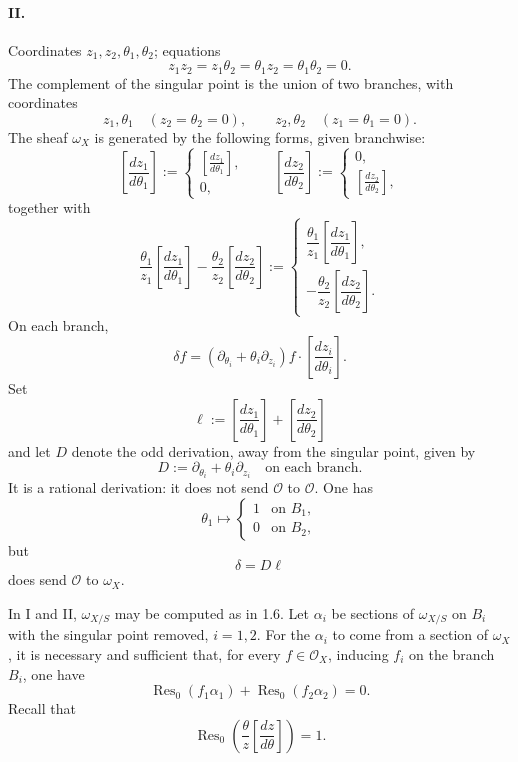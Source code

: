 \documentclass[11pt]{article}
\newcommand{\cO}{\mathcal O}
\newcommand{\Res}{\operatorname{Res}}
\begin{document}
\paragraph{II.}
Coordinates $z_1,z_2,\theta_1,\theta_2$; equations
\[
  z_1z_2=z_1\theta_2=\theta_1z_2=\theta_1\theta_2=0.
\]
The complement of the singular point is the union of two branches, with coordinates
\[
  z_1,\theta_1\quad (z_2=\theta_2=0),
  \qquad
  z_2,\theta_2\quad (z_1=\theta_1=0).
\]
The sheaf $\omega_X$ is generated by the following forms, given branchwise:
\[
\left[\frac{dz_1}{d\theta_1}\right]
 :=
 \begin{cases}
 \left[\frac{dz_1}{d\theta_1}\right],\\ 0,
 \end{cases}
\qquad
\left[\frac{dz_2}{d\theta_2}\right]
 :=
 \begin{cases}
 0,\\ \left[\frac{dz_2}{d\theta_2}\right],
 \end{cases}
\]
together with
\[
  \frac{\theta_1}{z_1}\left[\frac{dz_1}{d\theta_1}\right]
  -\frac{\theta_2}{z_2}\left[\frac{dz_2}{d\theta_2}\right]
  :=
  \begin{cases}
  \dfrac{\theta_1}{z_1}\left[\dfrac{dz_1}{d\theta_1}\right],\\[1.3ex]
  -\dfrac{\theta_2}{z_2}\left[\dfrac{dz_2}{d\theta_2}\right].
  \end{cases}
\]
On each branch,
\[
  \delta f=(\partial_{\theta_i}+\theta_i\partial_{z_i})f\cdot
  \left[\frac{dz_i}{d\theta_i}\right].
\]
Set
\[
  \ell:=\left[\frac{dz_1}{d\theta_1}\right]
       +\left[\frac{dz_2}{d\theta_2}\right]
\]
and let $D$ denote the odd derivation, away from the singular point, given by
\[
  D:=\partial_{\theta_i}+\theta_i\partial_{z_i}
  \quad\text{on each branch}.
\]
It is a rational derivation: it does not send $\cO$ to $\cO$. One has
\[
  \theta_1\longmapsto
  \begin{cases}1&\text{on }B_1,\\0&\text{on }B_2,
  \end{cases}
\]
but
\[
  \delta=D\ell
\]
does send $\cO$ to $\omega_X$.

In I and II, $\omega_{X/S}$ may be computed as in 1.6. Let $\alpha_i$ be sections of $\omega_{X/S}$ on $B_i$ with the singular point removed, $i=1,2$. For the $\alpha_i$ to come from a section of $\omega_X$, it is necessary and sufficient that, for every $f\in\cO_X$, inducing $f_i$ on the branch $B_i$, one have
\[
  \Res_0(f_1\alpha_1)+\Res_0(f_2\alpha_2)=0.
\]
Recall that
\[
  \Res_0\left(\frac{\theta}{z}\left[\frac{dz}{d\theta}\right]\right)=1.
\]
\end{document}
